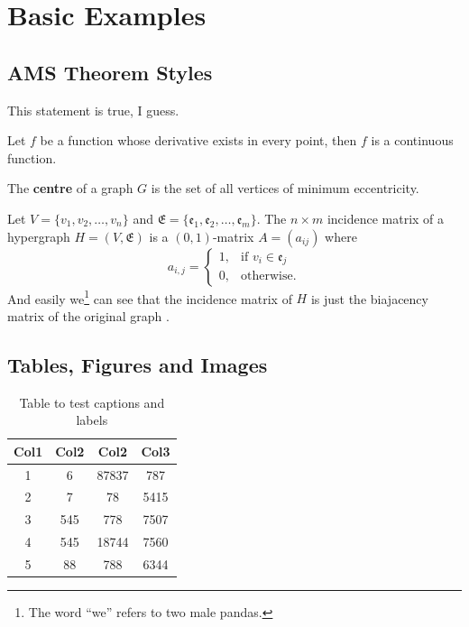 \chapter{Basic Examples}
\label{ch:ch1}

\section{AMS Theorem Styles}

\begin{remark}
	This statement is true, I guess.
\end{remark}

\begin{theorem}
	Let \(f\) be a function whose derivative exists in every point, then \(f\) is a continuous function.
\end{theorem}

\begin{definition}
	The \textbf{centre} of a graph \(G\) is the set of all vertices of minimum eccentricity.
\end{definition}

Let \(V = \{v_1, v_2, \dotsc, v_n\}\) and \(\mathfrak{E} = \{\mathfrak{e}_1, \mathfrak{e}_2, \dotsc, \mathfrak{e}_m\}\). The \(n \times m\) incidence matrix of a hypergraph \(H = (V, \mathfrak{E})\) is a \((0, 1)\)-matrix \(A = (a_{ij})\) where
\begin{equation*}
	a_{i, j} =
	\begin{cases}
		1, & \text{if \(v_i \in \mathfrak{e}_j\)} \\
		0, & \text{otherwise.}
	\end{cases}
\end{equation*}
And easily we\footnote{The word ``we'' refers to two male pandas.} can see that the incidence matrix of \(H\) is just the biajacency matrix of the original graph \cite[pp.~22]{tanenbaum2011computer}.

\section{Tables, Figures and Images}

\lipsum[1]

\begin{table}[ht]
	\centering
	\begin{tabular}{||c c c c||}
		\hline
		Col1 & Col2 & Col2 & Col3 \\ [0.5ex]
		\hline\hline
		1 & 6 & 87837\tablefootnote{This is a footnote in the table.} & 787 \\
		2 & 7 & 78 & 5415 \\
		3 & 545 & 778 & 7507 \\
		4 & 545 & 18744 & 7560 \\
		5 & 88 & 788 & 6344 \\ [1ex]
		\hline
	\end{tabular}
	\caption{Table to test captions and labels}
\end{table}

